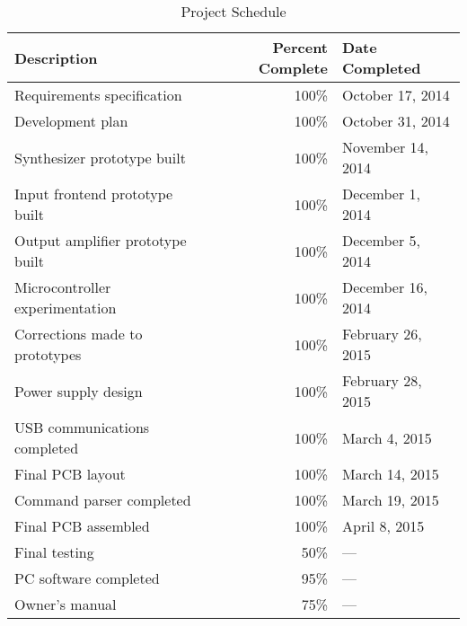 \begin{table}[H]
\centering
\begin{tabular}{|p{2.5in}|r|l|}
\hline
\textbf{Description} & \textbf{Percent Complete} & \textbf{Date Completed} \\ \hline \hline
Requirements specification          & 100\% & October 17, 2014 \\ \hline
Development plan                    & 100\% & October 31, 2014 \\ \hline
Synthesizer prototype built         & 100\% & November 14, 2014 \\ \hline
Input frontend prototype built      & 100\% & December 1, 2014 \\ \hline
Output amplifier prototype built    & 100\% & December 5, 2014 \\ \hline
Microcontroller experimentation     & 100\% & December 16, 2014 \\ \hline
Corrections made to prototypes      & 100\% & February 26, 2015 \\ \hline
Power supply design                 & 100\% & February 28, 2015 \\ \hline
USB communications completed        & 100\% & March 4, 2015 \\ \hline
Final PCB layout                    & 100\% & March 14, 2015 \\ \hline
Command parser completed            & 100\% & March 19, 2015 \\ \hline
Final PCB assembled                 & 100\% & April 8, 2015 \\ \hline
Final testing                       & 50\% & --- \\ \hline
PC software completed               & 95\% & --- \\ \hline
Owner's manual                      & 75\% & --- \\ \hline
\end{tabular}
\caption{Project Schedule}
\label{tab:schedule}
\end{table}
